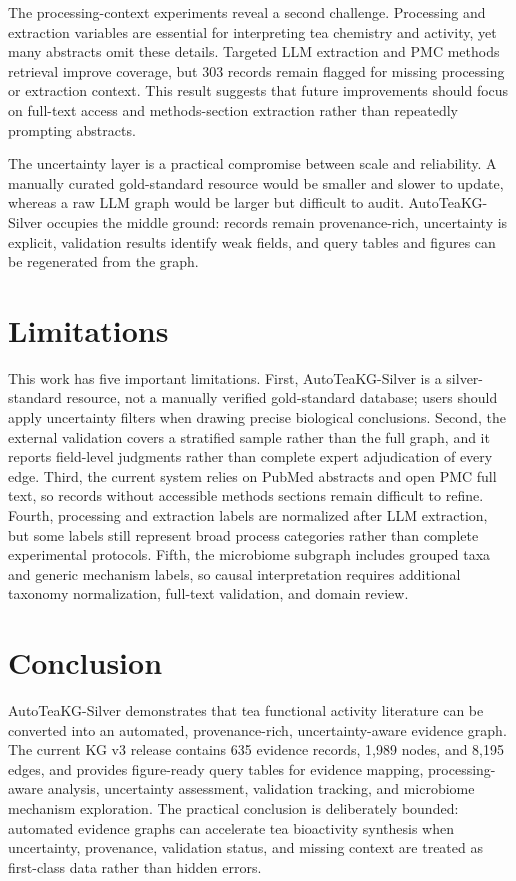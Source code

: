 \documentclass[11pt]{article}
\begin{document}
The processing-context experiments reveal a second challenge. Processing and extraction variables are essential for interpreting tea chemistry and activity, yet many abstracts omit these details. Targeted LLM extraction and PMC methods retrieval improve coverage, but 303 records remain flagged for missing processing or extraction context. This result suggests that future improvements should focus on full-text access and methods-section extraction rather than repeatedly prompting abstracts.

The uncertainty layer is a practical compromise between scale and reliability. A manually curated gold-standard resource would be smaller and slower to update, whereas a raw LLM graph would be larger but difficult to audit. AutoTeaKG-Silver occupies the middle ground: records remain provenance-rich, uncertainty is explicit, validation results identify weak fields, and query tables and figures can be regenerated from the graph.

\section{Limitations}

This work has five important limitations. First, AutoTeaKG-Silver is a silver-standard resource, not a manually verified gold-standard database; users should apply uncertainty filters when drawing precise biological conclusions. Second, the external validation covers a stratified sample rather than the full graph, and it reports field-level judgments rather than complete expert adjudication of every edge. Third, the current system relies on PubMed abstracts and open PMC full text, so records without accessible methods sections remain difficult to refine. Fourth, processing and extraction labels are normalized after LLM extraction, but some labels still represent broad process categories rather than complete experimental protocols. Fifth, the microbiome subgraph includes grouped taxa and generic mechanism labels, so causal interpretation requires additional taxonomy normalization, full-text validation, and domain review.

\section{Conclusion}

AutoTeaKG-Silver demonstrates that tea functional activity literature can be converted into an automated, provenance-rich, uncertainty-aware evidence graph. The current KG v3 release contains 635 evidence records, 1,989 nodes, and 8,195 edges, and provides figure-ready query tables for evidence mapping, processing-aware analysis, uncertainty assessment, validation tracking, and microbiome mechanism exploration. The practical conclusion is deliberately bounded: automated evidence graphs can accelerate tea bioactivity synthesis when uncertainty, provenance, validation status, and missing context are treated as first-class data rather than hidden errors.
\end{document}
